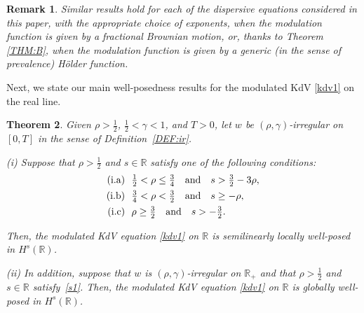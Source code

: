 \documentclass[letterpaper, 11pt,  reqno]{amsart}
\newtheorem{theorem}{Theorem} [section]
\newtheorem{remark}[theorem]{Remark}
\newcommand{\1}{\hspace{0.5mm}\text{I}\hspace{0.5mm}}
\newcommand{\noi}{\noindent}
\newcommand{\R}{\mathbb{R}}
\newcommand{\g}{\gamma}
\numberwithin{equation}{section}
\numberwithin{theorem}{section}
\begin{document}
\begin{remark}\rm
Similar results hold for each of the dispersive equations considered in this paper, with the appropriate choice of exponents, when the modulation function is given by a fractional Brownian motion, or,  thanks to Theorem \ref{THM:B}, when the modulation function is given by a generic (in the sense of prevalence) H\"older function.
\end{remark}



Next, 
we state our main well-posedness
results
for  the modulated KdV \eqref{kdv1} on the real line.




\begin{theorem}
\label{THM:2}
Given $\rho > \frac 12$,  $\frac12< \g < 1$, and $T> 0$, 
let  $w$ be $(\rho,\g)$-irregular on $[0, T]$ in the sense of Definition~\ref{DEF:ir}.

\smallskip

\noi
\textup{(i)}
Suppose that $\rho >  \frac 12$ and $s\in \R$
satisfy one of the following conditions\textup{:}
\begin{align}
\begin{split}
\textup{(i.a)} &\ \  \tfrac 12 < \rho \le \tfrac 34 \quad \text{and} \quad 
s > \tfrac 32 - 3 \rho, \\
\textup{(i.b)} &\ \  \tfrac 34 <  \rho <  \tfrac 32 \quad \text{and} \quad 
s \ge - \rho, \\
\textup{(i.c)} &\ \  \rho \ge  \tfrac 32\quad  \text{and} \quad  s > -\tfrac 32.
\end{split}
\label{regR1}
\end{align}



\noi
Then, the modulated KdV equation \eqref{kdv1}
on  $\R$
is semilinearly  locally well-posed in $H^s(\R)$.


\smallskip

\noi
\textup{(ii)}
In addition, suppose that 
  $w$ is $(\rho,\g)$-irregular on $\R_+$
and that $\rho > \frac 12$ and $s\in \R$
satisfy~\eqref{s1}.
Then, 
 the modulated KdV equation \eqref{kdv1}
on $\R$
is globally  well-posed in $H^s(\R)$.



\end{theorem}
\end{document}

